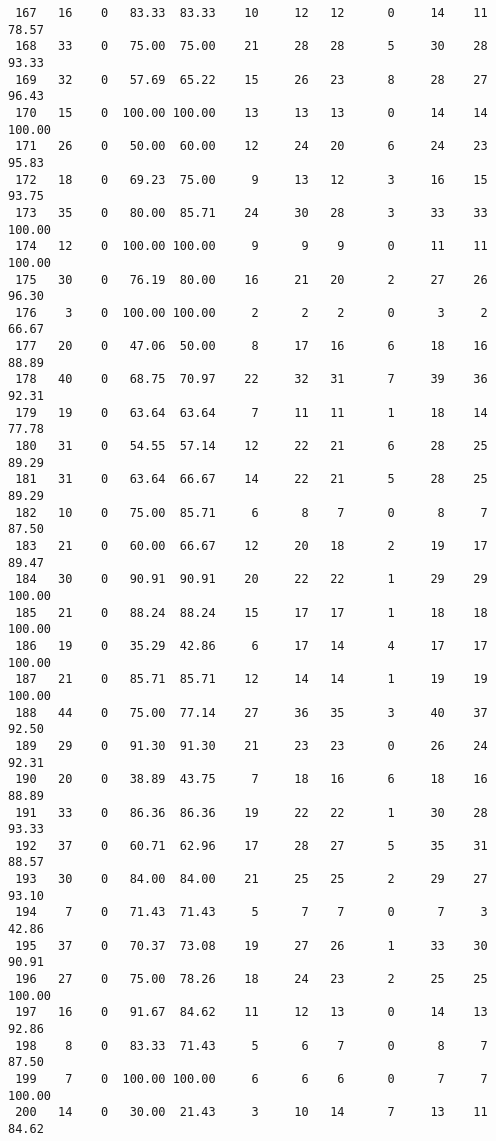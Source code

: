 \begin{verbatim}
 167   16    0   83.33  83.33    10     12   12      0     14    11    78.57
 168   33    0   75.00  75.00    21     28   28      5     30    28    93.33
 169   32    0   57.69  65.22    15     26   23      8     28    27    96.43
 170   15    0  100.00 100.00    13     13   13      0     14    14   100.00
 171   26    0   50.00  60.00    12     24   20      6     24    23    95.83
 172   18    0   69.23  75.00     9     13   12      3     16    15    93.75
 173   35    0   80.00  85.71    24     30   28      3     33    33   100.00
 174   12    0  100.00 100.00     9      9    9      0     11    11   100.00
 175   30    0   76.19  80.00    16     21   20      2     27    26    96.30
 176    3    0  100.00 100.00     2      2    2      0      3     2    66.67
 177   20    0   47.06  50.00     8     17   16      6     18    16    88.89
 178   40    0   68.75  70.97    22     32   31      7     39    36    92.31
 179   19    0   63.64  63.64     7     11   11      1     18    14    77.78
 180   31    0   54.55  57.14    12     22   21      6     28    25    89.29
 181   31    0   63.64  66.67    14     22   21      5     28    25    89.29
 182   10    0   75.00  85.71     6      8    7      0      8     7    87.50
 183   21    0   60.00  66.67    12     20   18      2     19    17    89.47
 184   30    0   90.91  90.91    20     22   22      1     29    29   100.00
 185   21    0   88.24  88.24    15     17   17      1     18    18   100.00
 186   19    0   35.29  42.86     6     17   14      4     17    17   100.00
 187   21    0   85.71  85.71    12     14   14      1     19    19   100.00
 188   44    0   75.00  77.14    27     36   35      3     40    37    92.50
 189   29    0   91.30  91.30    21     23   23      0     26    24    92.31
 190   20    0   38.89  43.75     7     18   16      6     18    16    88.89
 191   33    0   86.36  86.36    19     22   22      1     30    28    93.33
 192   37    0   60.71  62.96    17     28   27      5     35    31    88.57
 193   30    0   84.00  84.00    21     25   25      2     29    27    93.10
 194    7    0   71.43  71.43     5      7    7      0      7     3    42.86
 195   37    0   70.37  73.08    19     27   26      1     33    30    90.91
 196   27    0   75.00  78.26    18     24   23      2     25    25   100.00
 197   16    0   91.67  84.62    11     12   13      0     14    13    92.86
 198    8    0   83.33  71.43     5      6    7      0      8     7    87.50
 199    7    0  100.00 100.00     6      6    6      0      7     7   100.00
 200   14    0   30.00  21.43     3     10   14      7     13    11    84.62

\end{verbatim}
